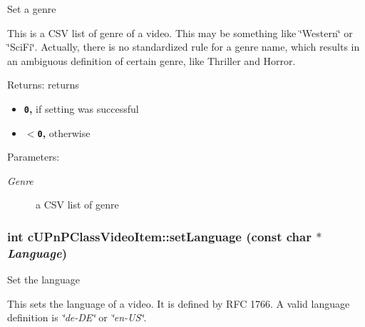 Set a genre

This is a CSV list of genre of a video. This may be something like \char`\"{}Western\char`\"{} or \char`\"{}SciFi\char`\"{}. Actually, there is no standardized rule for a genre name, which results in an ambiguous definition of certain genre, like Thriller and Horror.

\begin{Desc}
\item[Returns:]returns\begin{itemize}
\item {\bf {\tt 0},} if setting was successful\item {\bf {\tt $<$0},} otherwise \end{itemize}
\end{Desc}
\begin{Desc}
\item[Parameters:]
\begin{description}
\item[{\em Genre}]a CSV list of genre \end{description}
\end{Desc}
\hypertarget{classcUPnPClassVideoItem_89c24d198ce7bdc31aac727e65b02a84}{
\subsubsection[{setLanguage}]{\setlength{\rightskip}{0pt plus 5cm}int cUPnPClassVideoItem::setLanguage (const char $\ast$ {\em Language})}}
\label{classcUPnPClassVideoItem_89c24d198ce7bdc31aac727e65b02a84}


Set the language

This sets the language of a video. It is defined by RFC 1766. A valid language definition is {\em \char`\"{}de-DE\char`\"{}\/} or {\em \char`\"{}en-US\char`\"{}\/}.


